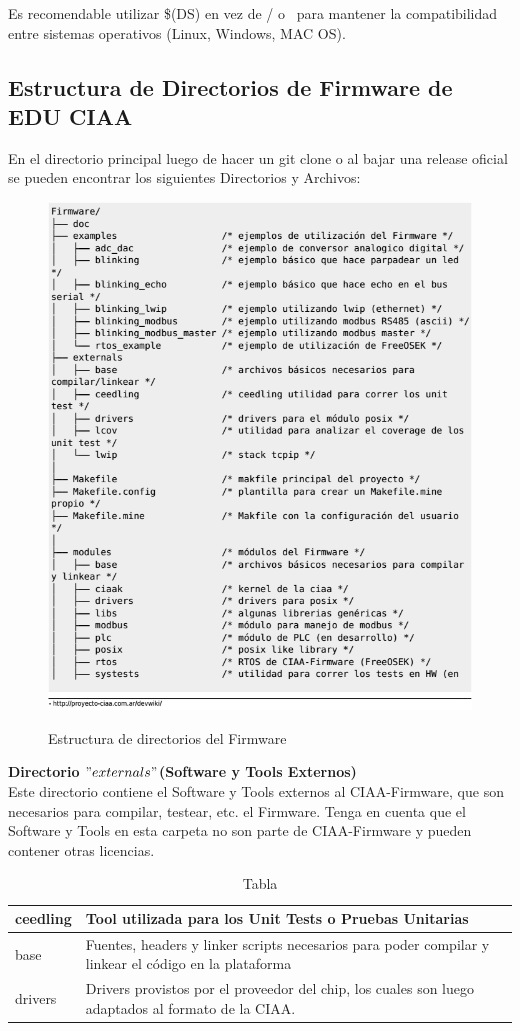 \documentclass[12pt,letterpaper]{article}
\begin{document}
Es recomendable utilizar \$(DS) en vez de / o \ para mantener la compatibilidad entre sistemas operativos (Linux, Windows, MAC OS).
{
\subsection{Estructura de Directorios de Firmware de EDU CIAA}
En el directorio principal luego de hacer un git clone o al bajar una release oficial se pueden encontrar los siguientes Directorios y Archivos:


\begin{figure}[!h]
\centering
\includegraphics[width=8 cm]{figuras/est_directorios_ciaa.png}\\
\caption{Estructura de directorios del Firmware}
\label{Fig3}
\end{figure}

\textbf{Directorio $"externals"$(Software y Tools Externos)}\\
Este directorio contiene el Software y Tools externos al CIAA-Firmware, que son necesarios para compilar, testear, etc. el Firmware. Tenga en cuenta que el Software y Tools en esta carpeta no son parte de CIAA-Firmware y pueden contener otras licencias.	

\begin{table}
\begin{center}
\begin{tabular}{|l|l|}
\hline\hline
ceedling & Tool utilizada para los Unit Tests o Pruebas Unitarias\\ \hline
base & Fuentes, headers y linker scripts necesarios para poder compilar y linkear el código en la plataforma\\ \hline
drivers & Drivers provistos por el proveedor del chip, los cuales son luego adaptados al formato de la CIAA.\\ \hline
\end{tabular}
\caption{Tabla}
\label{tabla}
\end{center}
\end{table}



}
\end{document}
